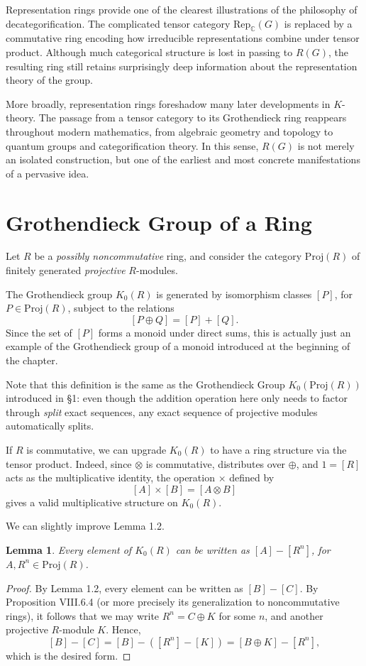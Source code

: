 \documentclass[12pt,reqno]{amsart}
\theoremstyle{plain}
\numberwithin{equation}{section}
\newtheorem{lemma}{Lemma}
\begin{document}
Representation rings provide one of the clearest illustrations of the philosophy of decategorification. The complicated tensor category $\mathrm{Rep}_{\mathbb C}(G)$ is replaced by a commutative ring encoding how irreducible representations combine under tensor product. Although much categorical structure is lost in passing to $R(G)$, the resulting ring still retains surprisingly deep information about the representation theory of the group.

More broadly, representation rings foreshadow many later developments in $K$-theory. The passage from a tensor category to its Grothendieck ring reappears throughout modern mathematics, from algebraic geometry and topology to quantum groups and categorification theory. In this sense, $R(G)$ is not merely an isolated construction, but one of the earliest and most concrete manifestations of a pervasive idea.



\section{Grothendieck Group of a Ring}
Let $R$ be a \textit{possibly noncommutative} ring, and consider the category $\mathrm{Proj}(R)$ of finitely generated \textit{projective} $R$-modules.

The Grothendieck group $K_0(R)$ is generated by isomorphism classes $[P]$, for $P\in \mathrm{Proj}(R)$, subject to the relations
\[[P\oplus Q]=[P]+[Q].\]
Since the set of $[P]$ forms a monoid under direct sums, this is actually just an example of the Grothendieck group of a monoid introduced at the beginning of the chapter.

Note that this definition is the same as the Grothendieck Group $K_0(\mathrm{Proj}(R))$ introduced in \S 1: even though the addition operation here only needs to factor through \textit{split} exact sequences, any exact sequence of projective modules automatically splits. 

If $R$ is commutative, we can upgrade $K_0(R)$ to have a ring structure via the tensor product. Indeed, since $\otimes$ is commutative, distributes over $\oplus$, and $1 = [R]$ acts as the multiplicative identity, the operation $\times$ defined by \[[A]\times [B]=[A\otimes B]\] gives a valid multiplicative structure on $K_0(R)$.   

We can slightly improve Lemma 1.2.
\begin{lemma}
    Every element of $K_0(R)$ can be written as $[A]-[R^n]$, for $A,R^n\in \mathrm{Proj}(R)$.
\end{lemma}
\begin{proof}
    By Lemma 1.2, every element can be written as $[B]-[C]$. By Proposition VIII.6.4 (or more precisely its generalization to noncommutative rings), it follows that we may write $R^n = C\oplus K$ for some $n$, and another projective $R$-module $K$. Hence,
    \[[B]-[C] = [B]-([R^n]-[K]) = [B\oplus K]-[R^n],\]
    which is the desired form.
\end{proof}
\end{document}
